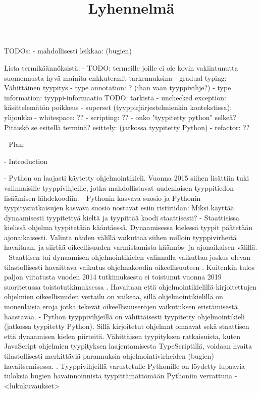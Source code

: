 \title{Lyhennelmä}

\begin{otherlanguage}{finnish}
TODOs:
    - mahdollisesti leikkaa: (bugien)

Lista termikäännöksistä:
    - TODO: termeille joille ei ole kovin vakiintunutta suomennusta hyvä mainita enkkutermit tarkennuksina
    - gradual typing: Vähittäinen tyypitys
    - type annotation: ? (ihan vaan tyyppivihje?)
    - type information: tyyppi-informaatio
        TODO: tarkista
    - unchecked exception: käsittelemätön poikkeus
    - superset (tyyppirjärjestelmienkin kontekstissa): ylijoukko
    - whitespace: ??
    - scripting: ??
    - onko "tyypitetty python" selkeä? Pitäiskö se esitellä terminä?
        esittely: (jatkossa tyypitetty Python)
    - refactor: ??

- Plan:

- Introduction

    - Python on laajasti käytetty ohjelmointikieli. Vuonna 2015 siihen lisättiin tuki valinnaisille tyyppivihjeille, jotka mahdollistavat uudenlaisen tyyppitiedon lisäämisen lähdekoodiin.
    - Pythonin kasvava suosio ja Pythonin tyypitysratkaisujen kasvava suosio nostavat esiin ristiriidan: Miksi käyttää dynaamisesti tyypitettyä kieltä ja tyypittää koodi staattisesti?
    - Staattisissa kielissä ohjelma tyypitetään kääntäessä. Dynaamisessa kielessä tyypit päätetään ajonaikaisesti. Valinta näiden välillä vaikuttaa siihen milloin tyyppivirheitä havaitaan, ja siirtää oikeellisuuden varmistamista käännös- ja ajonaikaisen välillä.
    - Staattisen tai dynaamisen ohjelmointikielen valinnalla vaikuttaa joskus olevan tilastollisesti havaittava vaikutus ohjelmakoodin oikeellisuuteen \cite{nanz_comparative_2015, ray_codequality_2014}. Kuitenkin tulos paljon viitatusta vuoden 2014 tutkimuksesta \cite{ray_codequality_2014} ei toistunut vuonna 2019 suoritetussa toistotutkimuksessa \cite{codequality_reproudction_2019}. Havaitaan että ohjelmointikielillä kirjoitettujen ohjelmien oikeellisuuden vertailu on vaikeaa, sillä ohjelmointikielillä on monenlaisia eroja jotka tekevät oikeellisuuserojen vaikutuksen eristämisestä haastavaa.
    - Python tyyppivihjeillä on vähittäisesti tyypitetty ohjelmointikieli (jatkossa tyypitetty Python). Sillä kirjoitetut ohjelmat omaavat sekä staattisen että dynaamisen kielen piirteitä. Vähittäisen tyypityksen ratkaisuista, kuten JavaScript ohjelmien tyypityksen laajentamisesta TypeScriptillä, voidaan hvaita tilastollisesti merkittäviä parannuksia ohjelmointivirheiden (bugien) havaitsemisessa. \cite{gao_to_type_or_not_2017}. Tyyppivihjeillä varustetulle Pythonille on löydetty lupaavia tuloksia bugien havainnoinnista tyypittämättömään Pythoniin verrattuna \cite{khan_empirical_2022, rak-amnouykit_taleoftwo_2020}
    - <lukukuvaukset>


\end{otherlanguage}

